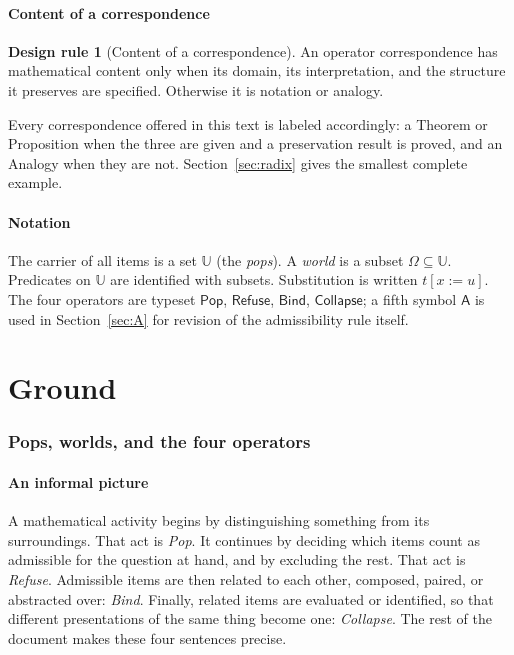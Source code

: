 \documentclass[11pt]{article}
\newcommand{\Pop}{\mathsf{Pop}}
\newcommand{\Refuse}{\mathsf{Refuse}}
\newcommand{\Bind}{\mathsf{Bind}}
\newcommand{\Coll}{\mathsf{Collapse}}
\newcommand{\Rev}{\mathsf{A}}
\newcommand{\U}{\mathbb{U}}
\newcommand{\Om}{\Omega}
\newcommand{\subst}[3]{#1[#2:=#3]}
\theoremstyle{definition}
\newtheorem{designrule}[definition]{Design rule}
\theoremstyle{plain}
\theoremstyle{remark}
\begin{document}
\subsection{Content of a correspondence}

\begin{designrule}[Content of a correspondence]\label{dr:content}
An operator correspondence has mathematical content only when its domain, its interpretation, and the structure it preserves are specified. Otherwise it is notation or analogy.
\end{designrule}

Every correspondence offered in this text is labeled accordingly: a Theorem or Proposition when the three are given and a preservation result is proved, and an Analogy when they are not. Section~\ref{sec:radix} gives the smallest complete example.

\subsection{Notation}

The carrier of all items is a set $\U$ (the \emph{pops}). A \emph{world} is a subset $\Om\subseteq\U$. Predicates on $\U$ are identified with subsets. Substitution is written $\subst{t}{x}{u}$. The four operators are typeset $\Pop$, $\Refuse$, $\Bind$, $\Coll$; a fifth symbol $\Rev$ is used in Section~\ref{sec:A} for revision of the admissibility rule itself.

\part{Ground}

\section{Pops, worlds, and the four operators}\label{sec:ops}

\subsection{An informal picture}

A mathematical activity begins by distinguishing something from its surroundings. That act is \emph{Pop}. It continues by deciding which items count as admissible for the question at hand, and by excluding the rest. That act is \emph{Refuse}. Admissible items are then related to each other, composed, paired, or abstracted over: \emph{Bind}. Finally, related items are evaluated or identified, so that different presentations of the same thing become one: \emph{Collapse}. The rest of the document makes these four sentences precise.
\end{document}
